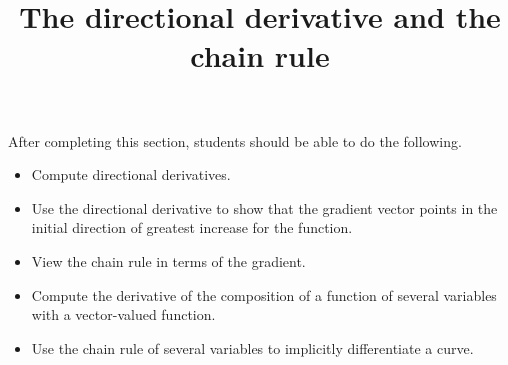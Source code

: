 \documentclass{ximera}
\title{The directional derivative and the chain rule}
\begin{document}
\begin{abstract}
\end{abstract}

\maketitle

\begin{sectionOutcomes}

After completing this section, students should be able to do the following.

\begin{itemize}
\item Compute directional derivatives.
\item Use the directional derivative to show that the gradient vector points in the initial direction of greatest increase for the function. 
\item View the chain rule in terms of the gradient.
\item Compute the derivative of the composition of a function of
  several variables with a vector-valued function.
\item Use the chain rule of several variables to implicitly
  differentiate a curve.
\end{itemize}

\end{sectionOutcomes}
\end{document}
